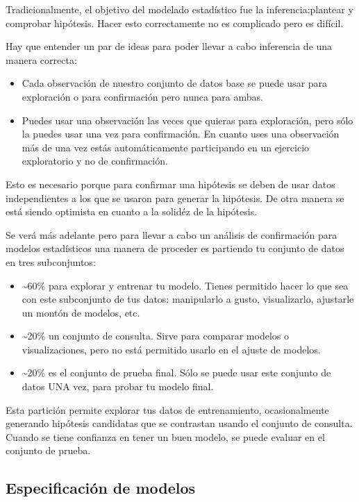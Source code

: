 \documentclass[]{book}
\theoremstyle{definition}
\theoremstyle{definition}
\theoremstyle{definition}
\theoremstyle{remark}
\begin{document}
Tradicionalmente, el objetivo del modelado estadístico fue la
inferencia:plantear y comprobar hipótesis. Hacer esto correctamente no
es complicado pero es difícil.

Hay que entender un par de ideas para poder llevar a cabo inferencia de
una manera correcta:

\begin{itemize}
\item
  Cada observación de nuestro conjunto de datos base se puede usar para
  exploración o para confirmación pero nunca para ambas.
\item
  Puedes usar una observación las veces que quieras para exploración,
  pero sólo la puedes usar una vez para confirmación. En cuanto uses una
  observación más de una vez estás automáticamente participando en un
  ejercicio exploratorio y no de confirmación.
\end{itemize}

Esto es necesario porque para confirmar una hipótesis se deben de usar
datos independientes a los que se usaron para generar la hipótesis. De
otra manera se está siendo optimista en cuanto a la solidéz de la
hipótesis.

Se verá más adelante pero para llevar a cabo un análisis de confirmación
para modelos estadísticos una manera de proceder es partiendo tu
conjunto de datos en tres subconjuntos:

\begin{itemize}
\item
  \textasciitilde{}60\% para explorar y entrenar tu modelo. Tienes
  permitido hacer lo que sea con este subconjunto de tus datos:
  manipularlo a gusto, visualizarlo, ajustarle un montón de modelos,
  etc.
\item
  \textasciitilde{}20\% un conjunto de consulta. Sirve para comparar
  modelos o visualizaciones, pero no está permitido usarlo en el ajuste
  de modelos.
\item
  \textasciitilde{}20\% es el conjunto de prueba final. Sólo se puede
  usar este conjunto de datos UNA vez, para probar tu modelo final.
\end{itemize}

Esta partición permite explorar tus datos de entrenamiento,
ocasionalmente generando hipótesis candidatas que se contrastan usando
el conjunto de consulta. Cuando se tiene confianza en tener un buen
modelo, se puede evaluar en el conjunto de prueba.

\subsection{Especificación de modelos}\label{especificacion-de-modelos}
\end{document}
